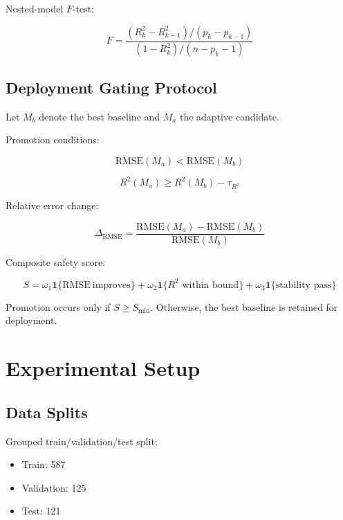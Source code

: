 \documentclass[conference]{IEEEtran}
\begin{document}
Nested-model $F$-test:

\begin{equation}
F =
\frac{(R_k^2 - R_{k-1}^2)/(p_k - p_{k-1})}
{(1 - R_k^2)/(n - p_k - 1)}
\end{equation}

\subsection{Deployment Gating Protocol}

Let $M_b$ denote the best baseline and $M_a$ the adaptive candidate.

Promotion conditions:

\begin{equation}
\mathrm{RMSE}(M_a) < \mathrm{RMSE}(M_b)
\end{equation}

\begin{equation}
R^2(M_a) \ge R^2(M_b) - \tau_{R^2}
\end{equation}

Relative error change:

\begin{equation}
\Delta_{\mathrm{RMSE}} =
\frac{\mathrm{RMSE}(M_a) - \mathrm{RMSE}(M_b)}
{\mathrm{RMSE}(M_b)}
\end{equation}

Composite safety score:

\begin{equation}
S =
\omega_1 \mathbf{1}\{\mathrm{RMSE\ improves}\}
+ \omega_2 \mathbf{1}\{R^2 \text{ within bound}\}
+ \omega_3 \mathbf{1}\{\text{stability pass}\}
\end{equation}

Promotion occurs only if $S \ge S_{\min}$. Otherwise, the best baseline is retained for deployment.
\section{Experimental Setup}

\subsection{Data Splits}

Grouped train/validation/test split:
\begin{itemize}
\item Train: 587
\item Validation: 125
\item Test: 121
\end{itemize}
\end{document}
